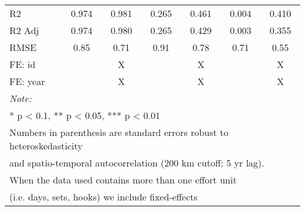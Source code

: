 \begin{table}
\begin{tabular}[t]{lcccccc}
\hspace{1em}R2 & 0.974 & 0.981 & 0.265 & 0.461 & 0.004 & 0.410\\
\hspace{1em}R2 Adj & 0.974 & 0.980 & 0.265 & 0.429 & 0.003 & 0.355\\
\hspace{1em}RMSE & 0.85 & 0.71 & 0.91 & 0.78 & 0.71 & 0.55\\
\midrule
FE: id &  & X &  & X &  & X\\
FE: year &  & X &  & X &  & X\\
\midrule
\bottomrule
\multicolumn{7}{l}{\rule{0pt}{1em}\textit{Note: }}\\
\multicolumn{7}{l}{\rule{0pt}{1em}* p < 0.1, ** p < 0.05, *** p < 0.01}\\
\multicolumn{7}{l}{\rule{0pt}{1em}Numbers in parenthesis are standard errors robust to heteroskedasticity}\\
\multicolumn{7}{l}{\rule{0pt}{1em}and spatio-temporal autocorrelation (200 km cutoff; 5 yr lag).}\\
\multicolumn{7}{l}{\rule{0pt}{1em}When the data used contains more than one effort unit}\\
\multicolumn{7}{l}{\rule{0pt}{1em}(i.e. days, sets, hooks) we include fixed-effects}\\
\end{tabular}
\end{table}